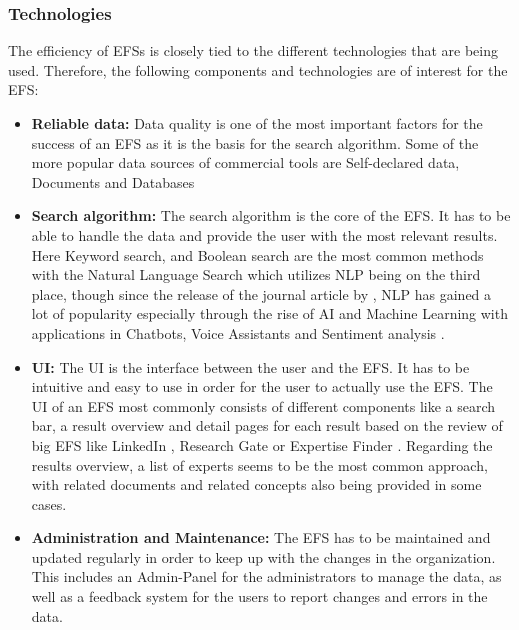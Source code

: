 \subsubsection{Technologies}
The efficiency of \acp{EFS} is closely tied to the different technologies that are being used. Therefore, the following components and technologies are of interest for the \ac{EFS}:
\begin{itemize}
    \item \textbf{Reliable data:} Data quality is one of the most important factors for the success of an \ac{EFS} as it is the basis for the search algorithm. Some of the more popular data sources of commercial tools are Self-declared data, Documents and Databases \parencite[18]{maybury_expert_2006}
    \item \textbf{Search algorithm:} The search algorithm is the core of the \ac{EFS}. It has to be able to handle the data and provide the user with the most relevant results. Here Keyword search, and Boolean search are the most common methods with the Natural Language Search which utilizes \ac{NLP} being on the third place, though since the release of the journal article by \textcite{maybury_expert_2006} \parencite[18]{maybury_expert_2006}, \ac{NLP} has gained a lot of popularity especially through the rise of \ac{AI} and Machine Learning with applications in Chatbots, Voice Assistants and Sentiment analysis \parencite{administrator_role_2023}. 
    \item \textbf{\ac{UI}:} The \ac{UI} is the interface between the user and the \ac{EFS}. It has to be intuitive and easy to use in order for the user to actually use the \ac{EFS}. The \ac{UI} of an \ac{EFS} most commonly consists of different components like a search bar, a result overview and detail pages for each result based on the review of big \ac{EFS} like LinkedIn \parencite{noauthor_linkedin_nodate}, Research Gate \parencite{noauthor_researchgate_nodate} or Expertise Finder \parencite{noauthor_expertise_nodate-1}. Regarding the results overview, a list of experts seems to be the most common approach, with related documents and related concepts also being provided in some cases. \parencite[18]{maybury_expert_2006}
    \item \textbf{Administration and Maintenance:} The \ac{EFS} has to be maintained and updated regularly in order to keep up with the changes in the organization. This includes an Admin-Panel for the administrators to manage the data, as well as a feedback system for the users to report changes and errors in the data.
\end{itemize}
